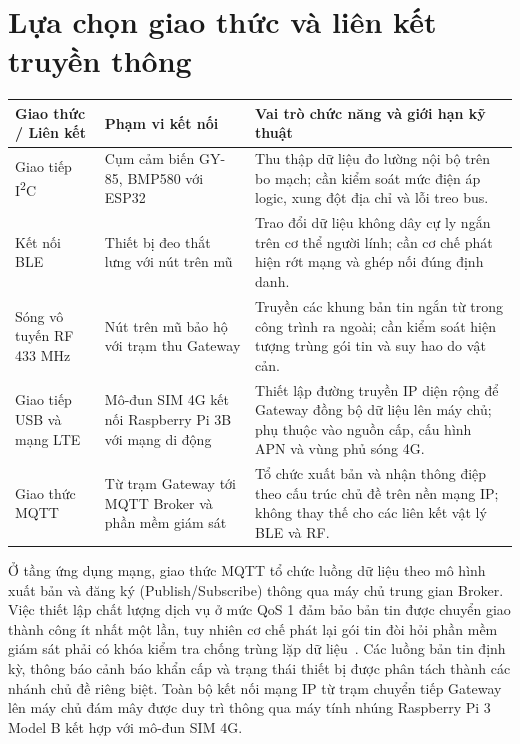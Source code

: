 \section{Lựa chọn giao thức và liên kết truyền thông}
\begingroup\SmallTable
\captionsetup{hypcap=false}\label{tab:links}
\noindent\begin{tabularx}{\linewidth}{|P{65bp}|P{115bp}|Y|}\hline
\textbf{Giao thức / Liên kết}&\textbf{Phạm vi kết nối}&\textbf{Vai trò chức năng và giới hạn kỹ thuật}\\\hline
Giao tiếp I\textsuperscript{2}C&Cụm cảm biến GY-85, BMP580 với ESP32&Thu thập dữ liệu đo lường nội bộ trên bo mạch; cần kiểm soát mức điện áp logic, xung đột địa chỉ và lỗi treo bus.\\\hline
Kết nối BLE&Thiết bị đeo thắt lưng với nút trên mũ&Trao đổi dữ liệu không dây cự ly ngắn trên cơ thể người lính; cần cơ chế phát hiện rớt mạng và ghép nối đúng định danh.\\\hline
Sóng vô tuyến RF 433 MHz&Nút trên mũ bảo hộ với trạm thu Gateway&Truyền các khung bản tin ngắn từ trong công trình ra ngoài; cần kiểm soát hiện tượng trùng gói tin và suy hao do vật cản.\\\hline
Giao tiếp USB và mạng LTE&Mô-đun SIM 4G kết nối Raspberry Pi 3B với mạng di động&Thiết lập đường truyền IP diện rộng để Gateway đồng bộ dữ liệu lên máy chủ; phụ thuộc vào nguồn cấp, cấu hình APN và vùng phủ sóng 4G.\\\hline
Giao thức MQTT&Từ trạm Gateway tới MQTT Broker và phần mềm giám sát&Tổ chức xuất bản và nhận thông điệp theo cấu trúc chủ đề trên nền mạng IP; không thay thế cho các liên kết vật lý BLE và RF.\\\hline
\end{tabularx}\endgroup

Ở tầng ứng dụng mạng, giao thức MQTT tổ chức luồng dữ liệu theo mô hình xuất bản và đăng ký (Publish/Subscribe) thông qua máy chủ trung gian Broker. Việc thiết lập chất lượng dịch vụ ở mức QoS 1 đảm bảo bản tin được chuyển giao thành công ít nhất một lần, tuy nhiên cơ chế phát lại gói tin đòi hỏi phần mềm giám sát phải có khóa kiểm tra chống trùng lặp dữ liệu~\cite{mqtt}. Các luồng bản tin định kỳ, thông báo cảnh báo khẩn cấp và trạng thái thiết bị được phân tách thành các nhánh chủ đề riêng biệt. Toàn bộ kết nối mạng IP từ trạm chuyển tiếp Gateway lên máy chủ đám mây được duy trì thông qua máy tính nhúng Raspberry Pi 3 Model B kết hợp với mô-đun SIM 4G.